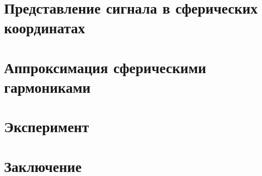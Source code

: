 \documentclass[12pt,twoside]{article}
\begin{document}
\section{Представление сигнала в сферических координатах}
\section{Аппроксимация сферическими гармониками}
\section{Эксперимент}
\section{Заключение}
\newpage


\end{document}

